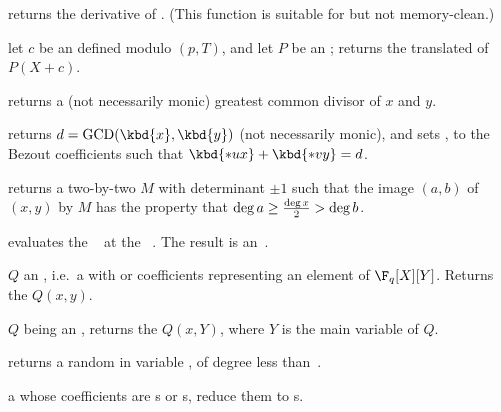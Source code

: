 





 returns the derivative of .
(This function is suitable for  but not memory-clean.)

 let $c$ be an 
defined modulo $(p, T)$, and let $P$ be an ; returns the translated
 of $P(X+c)$.

 returns a (not necessarily
monic) greatest common divisor of $x$  and $y$.

returns $d = \text{GCD}(\kbd{x},\kbd{y})$ (not necessarily monic), and sets
,  to the Bezout coefficients such that $\kbd{*ux} +
\kbd{*vy} = d$.

 returns a two-by-two
 $M$ with determinant $\pm 1$ such that the image $(a,b)$ of $(x,y)$
by $M$ has the property that $\deg a \geq {\deg x \over 2} > \deg b$.

 evaluates the ~
at the ~. The result is an~.

 $Q$ an ,
i.e.~a  with  or  coefficients representing an
element of $\F_q[X][Y]$. Returns the  $Q(x,y)$.

 $Q$ being an ,
returns the  $Q(x,Y)$, where $Y$ is the main variable of $Q$.

 returns a random
 in variable , of degree less than~.


  a  whose
coefficients are s or s, reduce them to s.

